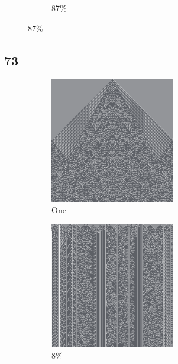 \documentclass[12pt, fleqn]{report}                             %
\theoremstyle{break}                                            %
\begin{document}
\begin{figure}[ht!]
\begin{subfigure}[b]{0.4\linewidth}
          \caption{87\%}
        \end{subfigure}
      \end{figure}


      \clearpage
      \subsection{73}
      \begin{figure}[ht!]
        \centering
        \begin{subfigure}[b]{0.4\linewidth}
          \includegraphics[width=0.6\textwidth]{Images/73/a.png}
          \caption{One}
        \end{subfigure}
        \begin{subfigure}[b]{0.4\linewidth}
          \includegraphics[width=0.6\textwidth]{Images/73/b.png}
          \caption{8\%}
        \end{subfigure}
        \begin{subfigure}[b]{0.4\linewidth}

\end{subfigure}
\end{figure}
\end{document}
